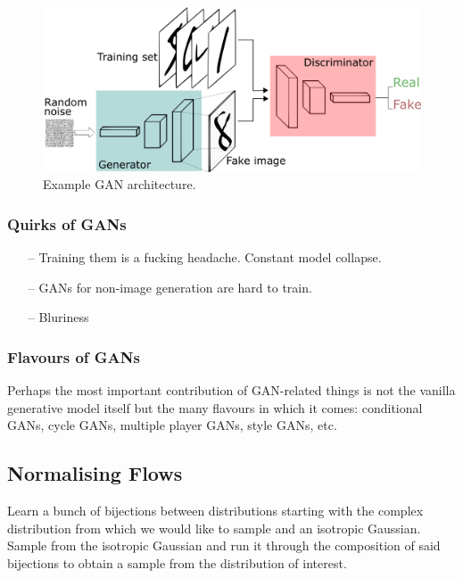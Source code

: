 \documentclass[11pt]{article}
\begin{document}
\begin{figure}[t]
    \centering
    \includegraphics[width=\textwidth]{./figures/generative_models/GAN_architecture.png}
    \caption{Example GAN architecture.}
    \label{fig:GAN_architecture}
\end{figure}

\subsubsection{Quirks of GANs}

\begin{itemize}
    \item[--] Training them is a fucking headache. Constant model collapse.
    \item[--] GANs for non-image generation are hard to train.
    \item[--] Bluriness
\end{itemize}

\subsubsection{Flavours of GANs}
Perhaps the most important contribution of GAN-related things is not the vanilla generative model itself but the many flavours in which it comes: conditional GANs, cycle GANs, multiple player GANs, style GANs, etc.

\subsection{\TODO Normalising Flows}
Learn a bunch of bijections between distributions starting with the complex distribution from which we would like to sample and an isotropic Gaussian. Sample from the isotropic Gaussian and run it through the composition of said bijections to obtain a sample from the distribution of interest.

\end{document}

